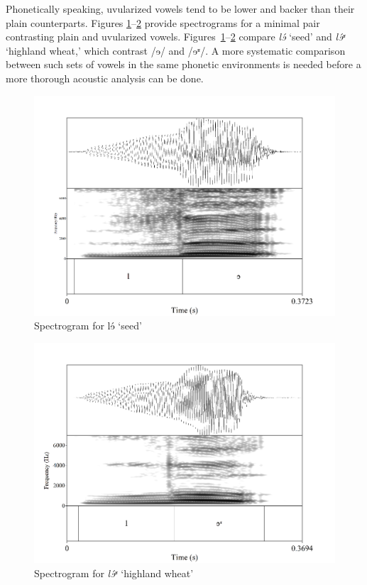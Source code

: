 \documentclass[output=paper]{langscibook}
\begin{document}
Phonetically speaking, uvularized vowels tend to be lower and backer than their plain counterparts. Figures \ref{fig:guan:2}--\ref{fig:guan:3} provide spectrograms for a minimal pair contrasting plain and uvularized vowels. Figures~\ref{fig:guan:2}--\ref{fig:guan:3} compare \textit{lɘ́} ‘seed’ and \textit{lɘ́ʶ} ‘highland wheat,’ which contrast /ɘ/ and /ɘʶ/. A more systematic comparison between such sets of vowels in the same phonetic environments is needed before a more thorough acoustic analysis can be done.

 
\begin{figure}
\includegraphics[height=.45\textheight]{figures/Guan-img002.png}
\caption{Spectrogram for lɘ́ ‘seed’} 
\label{fig:guan:2}
\end{figure}

\begin{figure}
\caption{Spectrogram for \textit{lɘ́ʶ} ‘highland wheat’}
\label{fig:guan:3}
\includegraphics[height=.45\textheight]{figures/Guan-img003.png}
\end{figure}
\end{document}
